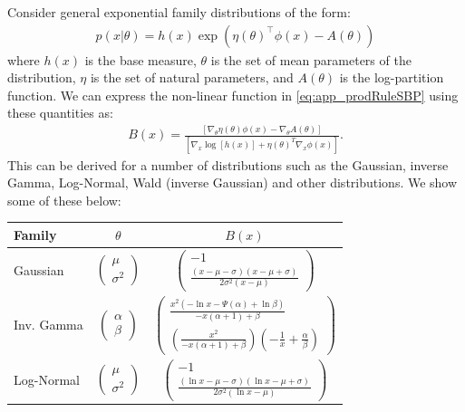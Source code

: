 \documentclass{article}
\begin{document}
\begin{bibunit}[icml2013]
Consider general exponential family distributions of the form:
\begin{align}
p (x | \theta) = h (x) \exp (\eta (\theta)^\top \phi (x) - A(\theta))
\end{align}
where $h(x)$ is the base measure, $\theta$ is the set of mean parameters of the distribution, $\eta$ is the set of natural parameters, and $A(\theta)$ is the log-partition function. We can express the non-linear function in \eqref{eq:app_prodRuleSBP} using these quantities as:
\begin{align}
B(x) = \frac{[\nabla_{\theta} \eta (\theta) \phi (x) - \nabla_{\theta} A
(\theta)]}{[\nabla_x \log [h (x)] + \eta (\theta)^T \nabla_x \phi
(x)]}.
\end{align}
This can be derived for a number of distributions such as the Gaussian, inverse Gamma, Log-Normal, Wald (inverse Gaussian) and other distributions. We show some of these below:
\begin{table}[h]
\centering
\small
\begin{tabular}{l c c}
\hline
\textbf{Family} & $\theta$ & $B(x)$ \\
\hline \hline
Gaussian & $\left(\begin{array}{c}\mu\\\sigma^2 \end{array}\right)$ & $\left(\begin{array}{c}
  - 1\\
   \frac{(x - \mu - \sigma^{}) (x - \mu + \sigma)^{}}{2 \sigma^2 (x -
  \mu)}
\end{array}\right)$\\
Inv. Gamma & $\left(\begin{array}{c}\alpha\\\beta \end{array}\right)$ & $\left(\begin{array}{c} \frac{x^2(- \ln x - \Psi (\alpha) + \ln \beta)}{- x (\alpha + 1) + \beta}\\
  (\frac{x^2}{- x (\alpha + 1) + \beta})(- \frac{1}{x} + \frac{\alpha}{\beta})
\end{array}\right)$\\
Log-Normal & $\left(\begin{array}{c}\mu\\\sigma^2 \end{array}\right)$  & $\left(\begin{array}{c}
  - 1\\
   \frac{(\ln x - \mu - \sigma^{}) (\ln x - \mu + \sigma)^{}}{2
  \sigma^2 (\ln x - \mu)}
\end{array}\right)$ \\
\hline
\end{tabular}
\end{table}


\end{bibunit}
\end{document}
